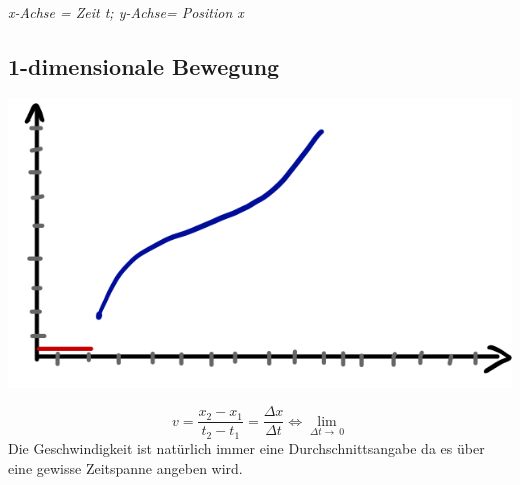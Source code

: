 \documentclass[11pt]{article}
\begin{document}
\begin{center}
		\textit{x-Achse = Zeit t; y-Achse= Position x}
	\end{center}
	\subsection{1-dimensionale Bewegung}
	\begin{center}
		\includegraphics[scale=0.3]{20190411_073844099_iOS.png}
	\end{center}
	\[ v = \frac{x_2 - x_1}{t_2 - t_1} = \frac{\Delta x}{\Delta t} \Leftrightarrow \lim_{\Delta t\to\ 0} \]
	Die Geschwindigkeit ist natürlich immer eine Durchschnittsangabe da es über eine gewisse Zeitspanne angeben wird. 
	
	\newpage
\end{document}
